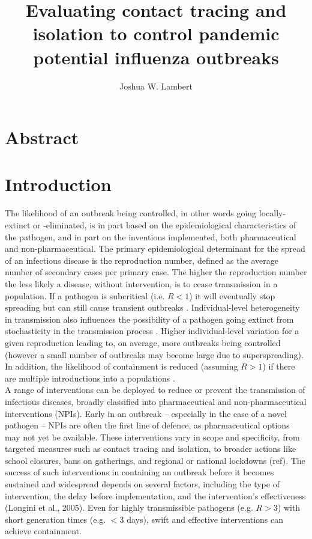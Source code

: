 \documentclass{article}
\title{Evaluating contact tracing and isolation to control pandemic potential influenza outbreaks}
\author{Joshua W. Lambert}
\date{}
\begin{document}
\maketitle

\section*{Abstract}

\section*{Introduction}

The likelihood of an outbreak being controlled, in other words going locally-extinct or -eliminated, is in part based on the epidemiological characteristics of the pathogen, and in part on the inventions implemented, both pharmaceutical and non-pharmaceutical. The primary epidemiological determinant for the spread of an infectious disease is the reproduction number, defined as the average number of secondary cases  per primary case. The higher the reproduction number the less likely a disease, without intervention, is to cease transmission in a population. If a pathogen is subcritical (i.e. $R < 1$) it will eventually stop spreading but can still cause transient outbreaks \citep{farringtonDistributionTimeExtinction1999}. Individual-level heterogeneity in transmission also influences the possibility of a pathogen going extinct from stochasticity in the transmission process \citep{lloyd-smithSuperspreadingEffectIndividual2005}. Higher individual-level variation for a given reproduction leading to, on average, more outbreaks being controlled (however a small number of outbreaks may become large due to superspreading). In addition, the likelihood of containment is reduced (assuming $R > 1$) if there are multiple introductions into a populations \citep{kucharskiEarlyDynamicsTransmission2020}. \\

A range of interventions can be deployed to reduce or prevent the transmission of infectious diseases, broadly classified into pharmaceutical and non-pharmaceutical interventions (NPIs). Early in an outbreak -- especially in the case of a novel pathogen -- NPIs are often the first line of defence, as pharmaceutical options may not yet be available. These interventions vary in scope and specificity, from targeted measures such as contact tracing and isolation, to broader actions like school closures, bans on gatherings, and regional or national lockdowns (ref). The success of such interventions in containing an outbreak before it becomes sustained and widespread depends on several factors, including the type of intervention, the delay before implementation, and the intervention’s effectiveness (Longini et al., 2005). Even for highly transmissible pathogens (e.g. $R>3$) with short generation times (e.g. $<3$ days), swift and effective interventions can achieve containment. \\
\end{document}
